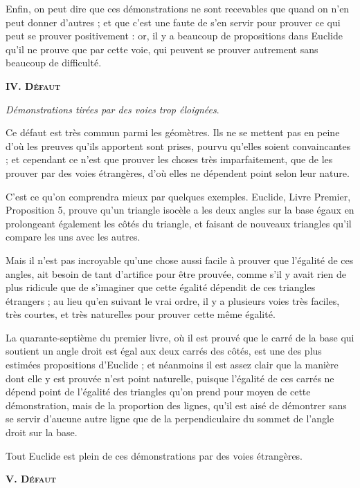 Enfin, on peut dire que ces démonstrations ne sont recevables que quand on n'en peut donner d'autres ; et que c'est une faute de s'en servir pour prouver ce qui peut se prouver positivement : or, il y a beaucoup de propositions dans Euclide qu'il ne prouve que par cette voie, qui peuvent se prouver autrement sans beaucoup de difficulté.

\begin{center}{\bfseries\scshape IV. Défaut}\end{center}

	\emph{Démonstrations tirées par des voies trop éloignées}.

Ce défaut est très commun parmi les géomètres. Ils ne se mettent pas en peine d'où les preuves qu'ils apportent sont prises, pourvu qu'elles soient convaincantes ; et cependant ce n'est que prouver les choses très imparfaitement, que de les prouver par des voies étrangères, d'où elles ne dépendent point selon leur nature.

C'est ce qu'on comprendra mieux par quelques exemples. Euclide, Livre Premier, Proposition 5, prouve qu'un triangle isocèle a les deux angles sur la base égaux en prolongeant également les côtés du triangle, et faisant de nouveaux triangles qu'il compare les uns avec les autres.

Mais il n'est pas incroyable qu'une chose aussi facile à prouver que l'égalité de ces angles, ait besoin de tant d'artifice pour être prouvée, comme s'il y avait rien de plus ridicule que de s'imaginer que cette égalité dépendit de ces triangles étrangers ; au lieu qu'en suivant le vrai ordre, il y a plusieurs voies très faciles, très courtes, et très naturelles pour prouver cette même égalité.

La quarante-septième du premier livre, où il est prouvé que le carré de la base qui soutient un angle droit est égal aux deux carrés des côtés, est une des plus estimées propositions d'Euclide ; et néanmoins il est assez clair que la manière dont elle y est prouvée n'est point naturelle, puisque l'égalité de ces carrés ne dépend point de l'égalité des triangles qu'on prend pour moyen de cette démonstration, mais de la proportion des lignes, qu'il est aisé de démontrer sans se servir d'aucune autre ligne que de la perpendiculaire du sommet de l'angle droit sur la base.

Tout Euclide est plein de ces démonstrations par des voies étrangères.

\begin{center}{\bfseries\scshape V. Défaut}\end{center}

